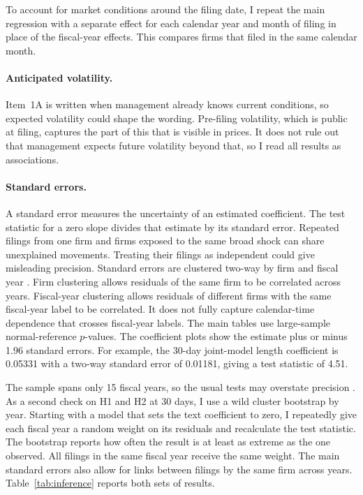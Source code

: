 To account for market conditions around the filing date, I repeat the main regression with a separate effect for each calendar year and month of filing in place of the fiscal-year effects. This compares firms that filed in the same calendar month.

\paragraph{Anticipated volatility.} Item~1A is written when management already
knows current conditions, so expected volatility could shape the wording.
Pre-filing volatility, which is public at filing, captures the part of this
that is visible in prices. It does not rule out that management expects
future volatility beyond that, so I read all results as associations.

\paragraph{Standard errors.} A standard error measures the uncertainty of an estimated coefficient. The test statistic for a zero slope divides that estimate by its standard error. Repeated filings from one firm and firms exposed to the same broad shock can share unexplained movements. Treating their filings as independent could give misleading precision. Standard errors are clustered two-way by firm and
fiscal year \parencite{cameron2011robust, petersen2009}. Firm clustering allows
residuals of the same firm to be correlated across years. Fiscal-year
clustering allows residuals of different firms with the same fiscal-year
label to be correlated. It does not fully capture calendar-time dependence
that crosses fiscal-year labels. The main tables use large-sample normal-reference $p$-values. The coefficient plots show the estimate plus or minus 1.96 standard errors. For example, the 30-day joint-model length coefficient is 0.05331 with a two-way standard error of 0.01181, giving a test statistic of 4.51.

The sample spans only 15 fiscal years, so the usual tests may overstate precision \parencite{cameron2008}. As a second check on H1 and H2 at 30 days, I use a wild cluster bootstrap by year. Starting with a model that sets the text coefficient to zero, I repeatedly give each fiscal year a random weight on its residuals and recalculate the test statistic. The bootstrap reports how often the result is at least as extreme as the one observed. All filings in the same fiscal year receive the same weight. The main standard errors also allow for links between filings by the same firm across years. Table~\ref{tab:inference} reports both sets of results.


